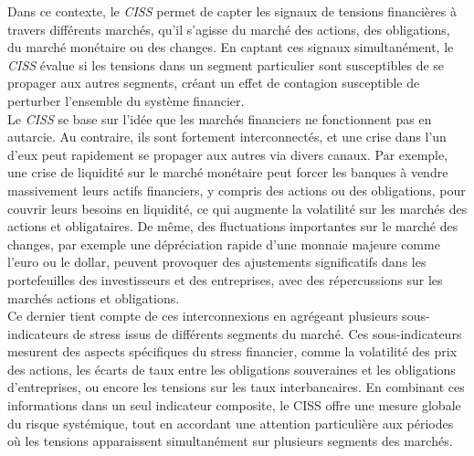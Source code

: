 Dans ce contexte, le \textit{CISS} permet de capter les signaux de tensions financières à travers différents marchés, qu'il s'agisse du marché des actions, des obligations, du marché monétaire ou des changes. En captant ces signaux simultanément, le \textit{CISS} évalue si les tensions dans un segment particulier sont susceptibles de se propager aux autres segments, créant un effet de contagion susceptible de perturber l’ensemble du système financier.\\

Le \textit{CISS} se base sur l'idée que les marchés financiers ne fonctionnent pas en autarcie. Au contraire, ils sont fortement interconnectés, et une crise dans l'un d'eux peut rapidement se propager aux autres via divers canaux. Par exemple, une crise de liquidité sur le marché monétaire peut forcer les banques à vendre massivement leurs actifs financiers, y compris des actions ou des obligations, pour couvrir leurs besoins en liquidité, ce qui augmente la volatilité sur les marchés des actions et obligataires. De même, des fluctuations importantes sur le marché des changes, par exemple une dépréciation rapide d'une monnaie majeure comme l'euro ou le dollar, peuvent provoquer des ajustements significatifs dans les portefeuilles des investisseurs et des entreprises, avec des répercussions sur les marchés actions et obligations. \\

Ce dernier tient compte de ces interconnexions en agrégeant plusieurs sous-indicateurs de stress issus de différents segments du marché. Ces sous-indicateurs mesurent des aspects spécifiques du stress financier, comme la volatilité des prix des actions, les écarts de taux entre les obligations souveraines et les obligations d'entreprises, ou encore les tensions sur les taux interbancaires. En combinant ces informations dans un seul indicateur composite, le CISS offre une mesure globale du risque systémique, tout en accordant une attention particulière aux périodes où les tensions apparaissent simultanément sur plusieurs segments des marchés.\\

